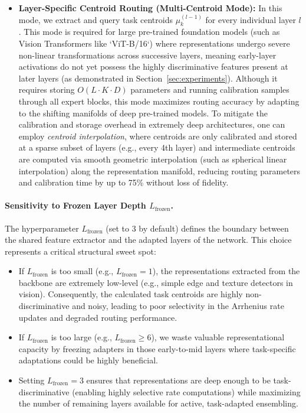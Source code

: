 \begin{itemize}
    \item \textbf{Layer-Specific Centroid Routing (Multi-Centroid Mode):} In this mode, we extract and query task centroids $\mu_k^{(l-1)}$ for every individual layer $l$. This mode is required for large pre-trained foundation models (such as Vision Transformers like `ViT-B/16`) where representations undergo severe non-linear transformations across successive layers, meaning early-layer activations do not yet possess the highly discriminative features present at later layers (as demonstrated in Section~\ref{sec:experiments}). Although it requires storing $O(L \cdot K \cdot D)$ parameters and running calibration samples through all expert blocks, this mode maximizes routing accuracy by adapting to the shifting manifolds of deep pre-trained models. To mitigate the calibration and storage overhead in extremely deep architectures, one can employ \emph{centroid interpolation}, where centroids are only calibrated and stored at a sparse subset of layers (e.g., every 4th layer) and intermediate centroids are computed via smooth geometric interpolation (such as spherical linear interpolation) along the representation manifold, reducing routing parameters and calibration time by up to 75\% without loss of fidelity.
\end{itemize}

\paragraph{Sensitivity to Frozen Layer Depth $L_{\text{frozen}}$.}
The hyperparameter $L_{\text{frozen}}$ (set to 3 by default) defines the boundary between the shared feature extractor and the adapted layers of the network. This choice represents a critical structural sweet spot:
\begin{itemize}
    \item If $L_{\text{frozen}}$ is too small (e.g., $L_{\text{frozen}} = 1$), the representations extracted from the backbone are extremely low-level (e.g., simple edge and texture detectors in vision). Consequently, the calculated task centroids are highly non-discriminative and noisy, leading to poor selectivity in the Arrhenius rate updates and degraded routing performance.
    \item If $L_{\text{frozen}}$ is too large (e.g., $L_{\text{frozen}} \ge 6$), we waste valuable representational capacity by freezing adapters in those early-to-mid layers where task-specific adaptations could be highly beneficial.
    \item Setting $L_{\text{frozen}} = 3$ ensures that representations are deep enough to be task-discriminative (enabling highly selective rate computations) while maximizing the number of remaining layers available for active, task-adapted ensembling.
\end{itemize}

